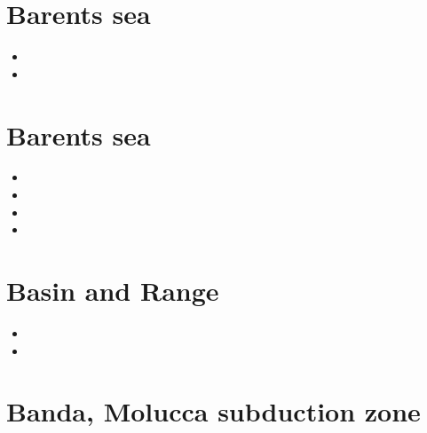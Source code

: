 
\section{Barents sea}

\begin{small}
\begin{itemize}
\item[2015] 
\item[2026] 
\end{itemize}
\end{small}


\section{Barents sea}

\begin{small}
\begin{itemize}
\item[\twothousandseven]
\item[\twothousandthirteen]
\item[\twothousandfourteen]
\item[\twothousandfifteen]
\end{itemize}
\end{small}

\section{Basin and Range}

\begin{small}
\begin{itemize}
\item[\nineteeneightynine]
\item[\twothousandnine]
\end{itemize}
\end{small}

\section{Banda, Molucca subduction zone}

